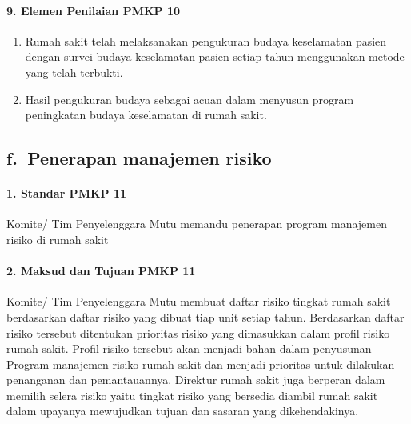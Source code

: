 \documentclass[
]{book}
\providecommand{\tightlist}{%
  \setlength{\itemsep}{0pt}\setlength{\parskip}{0pt}}
\begin{document}
\hypertarget{elemen-penilaian-pmkp-10}{%
\paragraph*{9. Elemen Penilaian PMKP 10}\label{elemen-penilaian-pmkp-10}}

\begin{enumerate}
\def\labelenumi{\alph{enumi}.}
\tightlist
\item
  Rumah sakit telah melaksanakan pengukuran budaya keselamatan pasien dengan survei budaya keselamatan pasien setiap tahun menggunakan metode yang telah terbukti.
\item
  Hasil pengukuran budaya sebagai acuan dalam menyusun program peningkatan budaya keselamatan di rumah sakit.
\end{enumerate}

\hypertarget{f.-penerapan-manajemen-risiko}{%
\subsection*{f.~Penerapan manajemen risiko}\label{f.-penerapan-manajemen-risiko}}

\hypertarget{standar-pmkp-11}{%
\paragraph*{1. Standar PMKP 11}\label{standar-pmkp-11}}

Komite/ Tim Penyelenggara Mutu memandu penerapan program manajemen risiko di rumah sakit

\hypertarget{maksud-dan-tujuan-pmkp-11}{%
\paragraph*{2. Maksud dan Tujuan PMKP 11}\label{maksud-dan-tujuan-pmkp-11}}

Komite/ Tim Penyelenggara Mutu membuat daftar risiko tingkat rumah sakit berdasarkan daftar risiko yang dibuat tiap unit setiap tahun. Berdasarkan daftar risiko tersebut ditentukan prioritas risiko yang dimasukkan dalam profil risiko rumah sakit. Profil risiko tersebut akan menjadi bahan dalam penyusunan Program manajemen risiko rumah sakit dan menjadi prioritas untuk dilakukan penanganan dan pemantauannya. Direktur rumah sakit juga berperan dalam memilih selera risiko yaitu tingkat risiko yang bersedia diambil rumah sakit dalam upayanya mewujudkan tujuan dan sasaran yang dikehendakinya.
\end{document}
